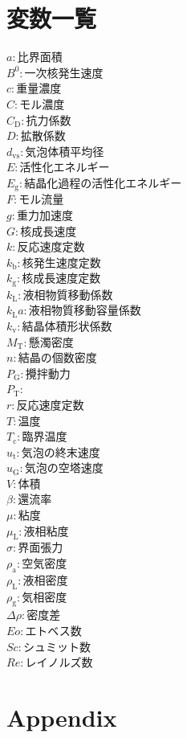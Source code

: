 \documentclass[a4j]{jsreport}
\begin{document}
\chapter*{変数一覧}
\begin{multicols}{2}
\begin{flushleft}
  $a : \text{比界面積}$ \\
  $B^0 : \text{一次核発生速度}$ \\
  $c : \text{重量濃度}$ \\
  $C : \text{モル濃度}$ \\
  $C_\mathrm{D} : \text{抗力係数}$ \\
  $D : \text{拡散係数}$ \\
  $d_\mathrm{vs} : \text{気泡体積平均径}$ \\
  $E : \text{活性化エネルギー}$ \\
  $E_\mathrm{g} : \text{結晶化過程の活性化エネルギー}$ \\
  $F : \text{モル流量}$ \\
  $g : \text{重力加速度}$ \\
  $G : \text{核成長速度}$ \\
  $k : \text{反応速度定数}$ \\
  $k_\mathrm{b} : \text{核発生速度定数}$ \\
  $k_\mathrm{g} : \text{核成長速度定数}$ \\
  $k_\mathrm{L} : \text{液相物質移動係数}$ \\
  $k_\mathrm{L} a : \text{液相物質移動容量係数}$ \\
  $k_\mathrm{v} : \text{結晶体積形状係数}$ \\
  $M_\mathrm{T} : \text{懸濁密度}$ \\
  $n : \text{結晶の個数密度}$ \\
  $P_\mathrm{G} : \text{攪拌動力}$ \\
  $P_\mathrm{T} : \text{}$ \\
  $r : \text{反応速度定数}$ \\
  $T : \text{温度}$ \\
  $T_\mathrm{c} : \text{臨界温度}$ \\
  $u_\mathrm{t} : \text{気泡の終末速度}$ \\
  $u_\mathrm{G} : \text{気泡の空塔速度}$ \\
  $V : \text{体積}$ \\
  $\beta : \text{還流率}$ \\
  $\mu : \text{粘度}$ \\
  $\mu_\mathrm{L} : \text{液相粘度}$ \\
  $\sigma : \text{界面張力}$ \\
  $\rho_\mathrm{a} : \text{空気密度}$ \\
  $\rho_\mathrm{L} : \text{液相密度}$ \\
  $\rho_\mathrm{g} : \text{気相密度}$ \\
  $\varDelta\rho : \text{密度差}$ \\
  $Eo : \text{エトベス数}$ \\
  $Sc : \text{シュミット数}$ \\
  $Re : \text{レイノルズ数}$
\end{flushleft}
\end{multicols}


\chapter*{Appendix}
\end{document}
